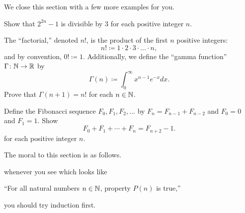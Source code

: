 \documentclass[../main.tex]{subfiles}
\begin{document}
We close this section with a few more examples for you.
\begin{exercise}
    Show that $2^{2n} - 1$ is divisible by 3 for each positive integer $n$.
\end{exercise}
\begin{exercise}
    The ``factorial,'' denoted $n!$, is the product of the first $n$ positive integers:
    \[n!\coloneqq1\cdot2\cdot3\cdot\ldots\cdot n,\]
    and by convention, $0!\coloneqq1$. Additionally, we define the ``gamma function'' $\Gamma\colon \mathbb N \to \mathbb R$ by
    \begin{equation*}
        \Gamma(n) \coloneqq \int_0^\infty x^{n - 1}e^{-x} dx.
    \end{equation*}
    Prove that $\Gamma(n + 1) = n!$ for each $n \in \mathbb N$.
\end{exercise}
\begin{exercise}
    Define the Fibonacci sequence $F_0,F_1,F_2,\ldots$ by $F_n=F_{n-1}+F_{n-2}$ and $F_0=0$ and $F_1=1$. Show
    \[F_0+F_1+\cdots+F_n=F_{n+2}-1.\]
    for each positive integer $n$.
\end{exercise}
The moral to this section is as follows.
\begin{idea}
    whenever you see which looks like
    \begin{center}
        ``For all natural numbers $n \in \mathbb N$, property $P(n)$ is true,''
    \end{center}
    you should try induction first.
\end{idea}
\end{document}
